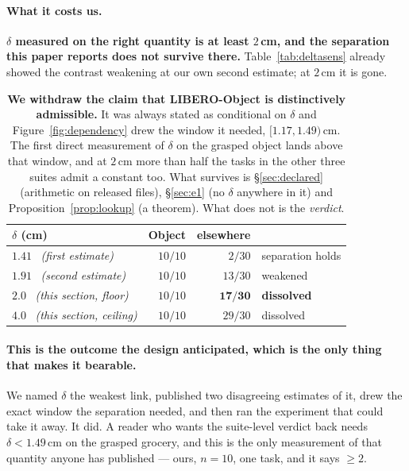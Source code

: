 \documentclass[10pt,twocolumn]{article}
\begin{document}
\paragraph{What it costs us.} \textbf{$\delta$ measured on the right quantity
is at least $2$\,cm, and the separation this paper reports does not survive
there.} Table~\ref{tab:deltasens} already showed the contrast weakening at
our own second estimate; at $2$\,cm it is gone.

\begin{table}[h]\centering\footnotesize
\setlength{\tabcolsep}{5pt}
\begin{tabular}{lrrl}
\toprule
$\delta$ (cm) & Object & elsewhere & \\
\midrule
$1.41$ \ \emph{(first estimate)} & $10/10$ & $2/30$ & separation holds \\
$1.91$ \ \emph{(second estimate)} & $10/10$ & $13/30$ & weakened \\
$\mathbf{2.0}$ \ \emph{(this section, floor)} & $10/10$ & $\mathbf{17/30}$ &
\textbf{dissolved} \\
$4.0$ \ \emph{(this section, ceiling)} & $10/10$ & $29/30$ & dissolved \\
\bottomrule
\end{tabular}
\caption{\textbf{We withdraw the claim that LIBERO-Object is distinctively
admissible.} It was always stated as conditional on $\delta$ and
Figure~\ref{fig:dependency} drew the window it needed, $[1.17, 1.49)$\,cm. The
first direct measurement of $\delta$ on the grasped object lands above that
window, and at $2$\,cm more than half the tasks in the other three suites admit
a constant too. What survives is \S\ref{sec:declared} (arithmetic on released
files), \S\ref{sec:e1} (no $\delta$ anywhere in it) and
Proposition~\ref{prop:lookup} (a theorem). What does not is the
\emph{verdict}.}
\label{tab:dissolve}
\end{table}

\paragraph{This is the outcome the design anticipated, which is the only thing
that makes it bearable.} We named $\delta$ the weakest link, published two
disagreeing estimates of it, drew the exact window the separation needed, and
then ran the experiment that could take it away. It did. A reader who wants the
suite-level verdict back needs $\delta < 1.49$\,cm on the grasped grocery, and
this is the only measurement of that quantity anyone has published --- ours,
$n{=}10$, one task, and it says $\geq 2$.
\end{document}
